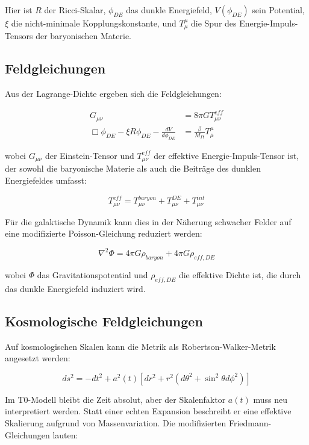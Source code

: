 \documentclass[a4paper,12pt]{article}
\begin{document}
	Hier ist $R$ der Ricci-Skalar, $\phi_{DE}$ das dunkle Energiefeld, $V(\phi_{DE})$ sein Potential, $\xi$ die nicht-minimale Kopplungskonstante, und $T^{\mu}_{\mu}$ die Spur des Energie-Impuls-Tensors der baryonischen Materie.
	
	\subsection{Feldgleichungen}
	
	Aus der Lagrange-Dichte ergeben sich die Feldgleichungen:
	
	\begin{align}
		G_{\mu\nu} &= 8\pi G T_{\mu\nu}^{eff}\\
		\Box\phi_{DE} - \xi R \phi_{DE} - \frac{dV}{d\phi_{DE}} &= \frac{\beta}{M_{Pl}}T^{\mu}_{\mu}
	\end{align}
	
	wobei $G_{\mu\nu}$ der Einstein-Tensor und $T_{\mu\nu}^{eff}$ der effektive Energie-Impuls-Tensor ist, der sowohl die baryonische Materie als auch die Beiträge des dunklen Energiefeldes umfasst:
	
	\begin{equation}
		T_{\mu\nu}^{eff} = T_{\mu\nu}^{baryon} + T_{\mu\nu}^{DE} + T_{\mu\nu}^{int}
	\end{equation}
	
	Für die galaktische Dynamik kann dies in der Näherung schwacher Felder auf eine modifizierte Poisson-Gleichung reduziert werden:
	
	\begin{equation}
		\nabla^2 \Phi = 4\pi G \rho_{baryon} + 4\pi G \rho_{eff,DE}
	\end{equation}
	
	wobei $\Phi$ das Gravitationspotential und $\rho_{eff,DE}$ die effektive Dichte ist, die durch das dunkle Energiefeld induziert wird.
	
	\subsection{Kosmologische Feldgleichungen}
	
	Auf kosmologischen Skalen kann die Metrik als Robertson-Walker-Metrik angesetzt werden:
	
	\begin{equation}
		ds^2 = -dt^2 + a^2(t)[dr^2 + r^2(d\theta^2 + \sin^2\theta d\phi^2)]
	\end{equation}
	
	Im T0-Modell bleibt die Zeit absolut, aber der Skalenfaktor $a(t)$ muss neu interpretiert werden. Statt einer echten Expansion beschreibt er eine effektive Skalierung aufgrund von Massenvariation. Die modifizierten Friedmann-Gleichungen lauten:
	
\end{document}

